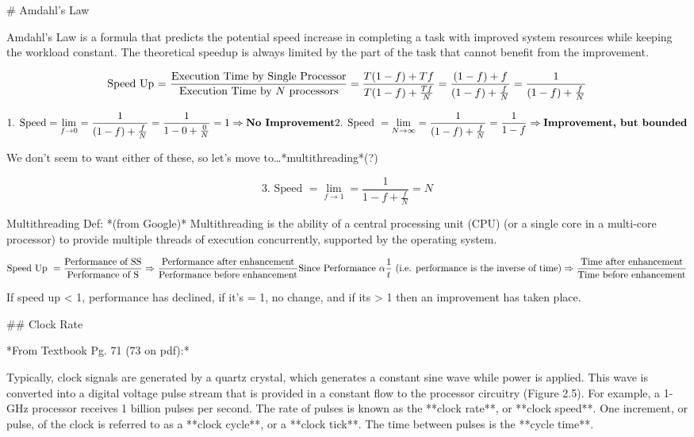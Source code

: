 # Amdahl’s Law

Amdahl's Law is a formula that predicts the potential speed increase in completing a task with improved system resources while keeping the workload constant. The theoretical speedup is always limited by the part of the task that cannot benefit from the improvement.

$$
\text{Speed Up = }\frac{\text{Execution Time by Single Processor}}{\text{Execution Time by $N$ processors}}\\=\frac{T(1-f)+Tf}{T(1-f) +\frac{Tf}{N}}\\=\frac{(1-f)+f}{(1-f)+\frac{f}{N}}\\=\frac{1}{(1-f)+\frac{f}{N}}
$$

$$
\text{1. Speed}=\lim_{f\rightarrow 0}=\frac{1}{(1-f)+\frac{f}{N}}\\=\frac{1}{1-0+\frac{0}{N}}=1 \Rightarrow \text{\textbf{No Improvement}}\\ \text{2. Speed }=\lim_{N\rightarrow \infty}=\frac{1}{(1-f)+\frac{f}{N}}=\frac{1}{1-f}\Rightarrow \text{\textbf{Improvement, but bounded}}
$$

We don’t seem to want either of these, so let’s move to…*multithreading*(?)

$$
\text{3. Speed }=\lim_{f\rightarrow 1}=\frac{1}{1-f+\frac{f}{N}}=N
$$

Multithreading Def: *(from Google)* Multithreading is the ability of a central processing unit (CPU) (or a single core in a multi-core processor) to provide multiple threads of execution concurrently, supported by the operating system.

$$
\text{Speed Up }=\frac{\text{Performance of SS}}{\text{Performance of S}}\\\Rightarrow\frac{\text{Performance after enhancement}}{\text{Performance before enhancement}}\\\text{Since Performance }\alpha\frac{1}{t}\text{ (i.e. performance is the inverse of time)}\\\Rightarrow\frac{\text{Time after enhancement}}{\text{Time before enhancement}}
$$

If speed up < 1, performance has declined, if it’s = 1, no change, and if its > 1 then an improvement has taken place.

## Clock Rate

*From Textbook Pg. 71 (73 on pdf):*

Typically, clock signals are generated by a quartz crystal, which generates a
constant sine wave while power is applied. This wave is converted into a digital
voltage pulse stream that is provided in a constant flow to the processor circuitry
(Figure 2.5). For example, a 1-GHz processor receives 1 billion pulses per second.
The rate of pulses is known as the **clock rate**, or **clock speed**. One increment, or
pulse, of the clock is referred to as a **clock cycle**, or a **clock tick**. The time between
pulses is the **cycle time**.

